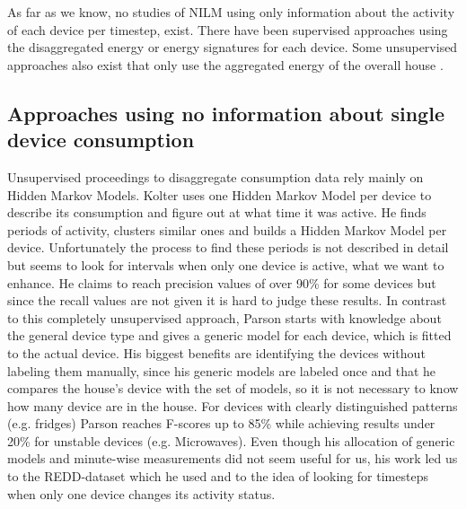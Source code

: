 \documentclass{article}
\begin{document}
As far as we know, no studies of NILM using only information about the activity of each device per timestep, exist.
There have been supervised approaches using the disaggregated energy\cite{Kelly} or energy signatures \cite{Parson} for each device.
Some unsupervised approaches also exist that only use the aggregated energy of the overall house \cite{Kolter}.




\subsection{Approaches using no information about single device consumption}
Unsupervised proceedings to disaggregate consumption data rely mainly on Hidden Markov Models. 
Kolter \cite{Kolter} uses one Hidden Markov Model per device to describe its consumption and figure out at what time 
it was active. He finds periods of activity, clusters similar ones and builds a Hidden Markov Model per device. 
Unfortunately the process to find these periods is not described in detail but seems to look for intervals when only 
one device is active, what we want to enhance. He claims to reach precision values of over 90\% for some devices but since the recall values are not 
given it is hard to judge these results. 
In contrast to this completely unsupervised approach, Parson starts with knowledge about the general device type and 
gives a generic model for each device, which is fitted to the actual device. His biggest benefits are identifying the 
devices without labeling them manually, since his generic models are labeled once and that he compares the house's device with 
the set of models, so it is not necessary to know how many device are in the house. For devices with clearly distinguished patterns 
(e.g. fridges) Parson reaches F-scores up to 85\% while achieving results under 20\% for unstable devices (e.g. Microwaves).
Even though his allocation of generic models and minute-wise measurements did not seem useful for us, his work led 
us to the REDD-dataset which he used
and to the idea of looking for timesteps when only one device changes its activity status.
\end{document}
